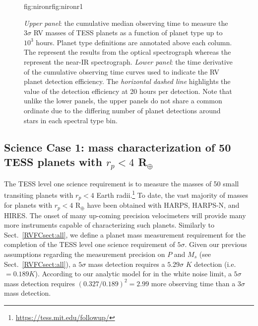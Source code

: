 \begin{figure}
\begin{ocg}{fig:nironr}{fig:nironr}{1}
  \end{ocg}
  \hspace{-\hsize}%
  \caption[Cumulative mean observing times to measure RV masses of TOI planets versus planet type.]
          {\small \emph{Upper panel}: the cumulative median observing time to measure the $3\sigma$ RV masses of
    TESS planets as a function of planet type up to $10^3$ hours. Planet type definitions are annotated above
    each column. The  
     represent the results from
    the optical spectrograph whereas the
     represent the near-IR
    spectrograph. \emph{Lower panel}: the time derivative of the cumulative observing time curves used to indicate
    the RV planet detection efficiency. The \emph{horizontal dashed line} highlights the value of the detection
    efficiency at 20 hours per detection.
    Note that unlike the lower panels, the upper panels do not share a common ordinate due to the differing
    number of planet detections around stars in each spectral type bin.}
  \label{RVFCfig:cumulativerp}
\end{figure}


\subsection{Science Case 1: mass characterization of 50 TESS planets with $r_p < 4$ R$_{\oplus}$} \label{RVFCsect:lvl1}
The TESS level one science requirement is to measure the masses of 50 small transiting
planets with $r_p < 4$ Earth
radii.\footnote{\href{https://tess.mit.edu/followup/}{https://tess.mit.edu/followup/}}
To date, the vast majority of masses for planets with $r_p <4$ R$_{\oplus}$ have been obtained
with HARPS, HARPS-N, and HIRES. The onset of many up-coming precision velocimeters
will provide many more instruments capable of characterizing
such planets. Similarly to Sect.~\ref{RVFCsect:all}, we define a planet mass measurement
requirement for the completion of the TESS level one science requirement of $5\sigma$. 
Given our previous assumptions regarding the measurement precision on $P$ and
$M_s$ (see Sect.~\ref{RVFCsect:all}),
a $5\sigma$ mass detection requires a $5.29\sigma$ $K$ detection (i.e. \sigK{} $=0.189 K$).
According to our analytic model for \nrv{} in the white noise limit, a $5\sigma$ mass detection requires
$(0.327/0.189)^2 = 2.99$ more observing time than a $3\sigma$ mass detection. \\

